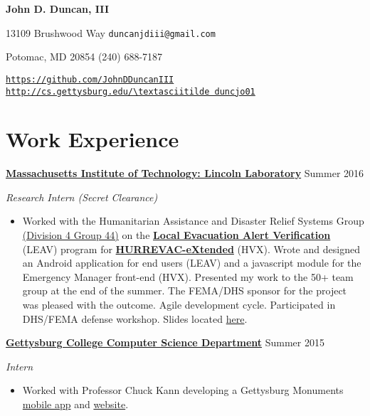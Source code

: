 \documentclass[11pt]{article}
\begin{document}
\fancyfoot{}
\pagestyle{fancy}
\thispagestyle{empty}
\renewcommand{\headrulewidth}{0pt}
\begin{center}
	{\huge \textbf{John D. Duncan, III}}
\end{center}
13109 Brushwood Way
\hfill
\texttt{duncanjdiii@gmail.com}

Potomac, MD 20854
\hfill
(240) 688-7187

\texttt{\url{https://github.com/JohnDDuncanIII}}
\hfill
\texttt{\url{http://cs.gettysburg.edu/\textasciitilde duncjo01}}

\section*{Work Experience}
\textbf{\href{http://www.ll.mit.edu/}{Massachusetts Institute of Technology: Lincoln Laboratory}}
\hfill
Summer 2016

\textit{Research Intern \small{(Secret Clearance)}}

\begin{itemize}
\item[] Worked with the Humanitarian Assistance and Disaster Relief Systems Group \href{https://www.ll.mit.edu/employment/division4.html#gp44}{(Division 4 Group 44)} on the \href{https://www.dhs.gov/publication/national-hurricane-program-technology-modernization-local-evacuation-alert-verification}{\textbf{Local Evacuation Alert Verification}} (LEAV) program for \href{https://www.dhs.gov/publication/national-hurricane-program-technology-modernization-hurrevac-extended-hv-x}{\textbf{HURREVAC-eXtended}} (HVX). Wrote and designed an Android application for end users (LEAV) and a javascript module for the Emergency Manager front-end (HVX). Presented my work to the 50+ team group at the end of the summer. The FEMA/DHS sponsor for the project was pleased with the outcome. Agile development cycle. Participated in DHS/FEMA defense workshop. Slides located \href{https://docs.google.com/presentation/d/1d6u7eK2fBJElrRpEn1KlkTfReKO_tHj5iCAGb6vgtmg/}{here}.\\
\end{itemize}

\textbf{\href{http://cs.gettysburg.edu/}{Gettysburg College Computer Science Department}}
\hfill
Summer 2015

\textit{Intern}

\begin{itemize}
\item[] Worked with Professor Chuck Kann developing a Gettysburg Monuments \href{https://play.google.com/store/apps/details?id=edu.gettysburg.MonumentsMap}{mobile app} and \href{http://historicgettysburg.us/MonumentsMap/Monuments.html}{website}.\\
\end{itemize}
\end{document}
